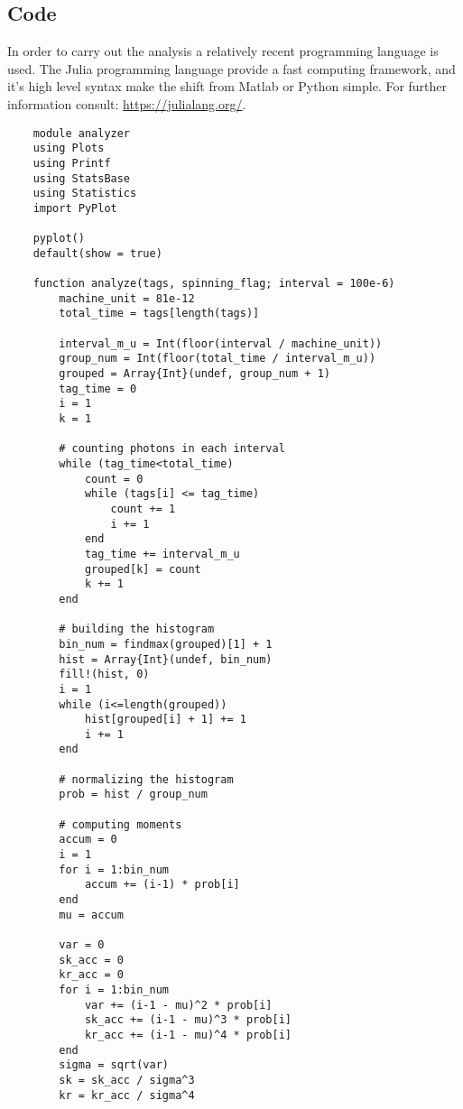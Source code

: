\documentclass[10pt, a4paper, final]{article}
\renewcommand{\baselinestretch}{1}
\begin{document}
\begin{multicols}{2}
\end{multicols}

\hrulefill
\subsection*{Code}
In order to carry out the analysis a relatively recent programming language is used. The Julia programming language provide a fast computing framework, and it's high level syntax make the shift from Matlab or Python simple. For further information consult: \url{https://julialang.org/}.

\renewcommand{\baselinestretch}{0.5}
\begin{mdframed}
  \begin{lstlisting}
    module analyzer
    using Plots
    using Printf
    using StatsBase
    using Statistics
    import PyPlot
    
    pyplot()
    default(show = true)
    
    function analyze(tags, spinning_flag; interval = 100e-6)
        machine_unit = 81e-12
        total_time = tags[length(tags)]
    
        interval_m_u = Int(floor(interval / machine_unit))
        group_num = Int(floor(total_time / interval_m_u))
        grouped = Array{Int}(undef, group_num + 1)
        tag_time = 0
        i = 1
        k = 1
    
        # counting photons in each interval
        while (tag_time<total_time)
            count = 0
            while (tags[i] <= tag_time)
                count += 1
                i += 1
            end
            tag_time += interval_m_u
            grouped[k] = count
            k += 1
        end
        
        # building the histogram
        bin_num = findmax(grouped)[1] + 1
        hist = Array{Int}(undef, bin_num)
        fill!(hist, 0)
        i = 1
        while (i<=length(grouped))
            hist[grouped[i] + 1] += 1
            i += 1
        end
    
        # normalizing the histogram
        prob = hist / group_num
    
        # computing moments
        accum = 0
        i = 1
        for i = 1:bin_num
            accum += (i-1) * prob[i]
        end
        mu = accum
    
        var = 0
        sk_acc = 0
        kr_acc = 0 
        for i = 1:bin_num
            var += (i-1 - mu)^2 * prob[i]
            sk_acc += (i-1 - mu)^3 * prob[i]
            kr_acc += (i-1 - mu)^4 * prob[i]
        end
        sigma = sqrt(var)
        sk = sk_acc / sigma^3
        kr = kr_acc / sigma^4
    

\end{lstlisting}
\end{mdframed}
\end{document}
